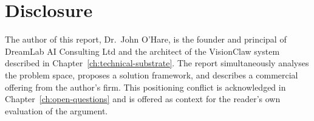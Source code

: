 \section{Disclosure}

The author of this report, Dr.\ John O'Hare, is the founder and principal of DreamLab AI Consulting Ltd and the architect of the VisionClaw system described in Chapter~\ref{ch:technical-substrate}. The report simultaneously analyses the problem space, proposes a solution framework, and describes a commercial offering from the author's firm. This positioning conflict is acknowledged in Chapter~\ref{ch:open-questions} and is offered as context for the reader's own evaluation of the argument.
